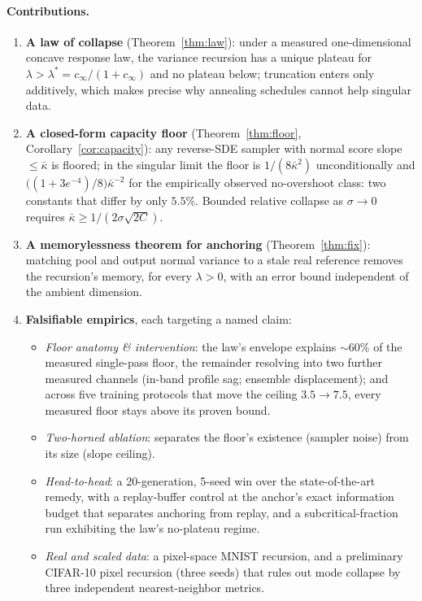 \documentclass[11pt]{article}
\theoremstyle{remark}
\newcommand{\kb}{\bar\kappa}
\begin{document}
\paragraph{Contributions.}
\begin{enumerate}\itemsep2pt
\item \textbf{A law of collapse} (Theorem~\ref{thm:law}): under a measured
  one-dimensional concave response law, the variance recursion has a unique plateau for
  $\lambda>\lambda^*=c_\infty/(1+c_\infty)$ and no plateau below; truncation enters only
  additively, which makes precise why annealing schedules cannot help singular data.
\item \textbf{A closed-form capacity floor} (Theorem~\ref{thm:floor},
  Corollary~\ref{cor:capacity}): any reverse-SDE sampler with normal score slope
  $\le\kb$ is floored; in the singular limit the floor is $1/(8\kb^2)$ unconditionally
  and $\big((1+3e^{-4})/8\big)\kb^{-2}$ for the empirically observed no-overshoot class:
  two constants that differ by only $5.5\%$. Bounded relative collapse as $\sigma\to0$
  requires $\kb\ge 1/(2\sigma\sqrt{2C})$.
\item \textbf{A memorylessness theorem for anchoring} (Theorem~\ref{thm:fix}): matching
  pool and output normal variance to a stale real reference removes the recursion's
  memory, for every $\lambda>0$, with an error bound independent of the ambient dimension.
\item \textbf{Falsifiable empirics}, each targeting a named claim:
  \begin{itemize}\itemsep1pt
  \item \emph{Floor anatomy \& intervention}: the law's envelope explains ${\sim}60\%$ of
    the measured single-pass floor, the remainder resolving into two further measured
    channels (in-band profile sag; ensemble displacement); and across five training
    protocols that move the ceiling $3.5\to7.5$, every measured floor stays above its
    proven bound.
  \item \emph{Two-horned ablation}: separates the floor's existence (sampler noise) from
    its size (slope ceiling).
  \item \emph{Head-to-head}: a 20-generation, 5-seed win over the state-of-the-art remedy,
    with a replay-buffer control at the anchor's exact information budget that separates
    anchoring from replay, and a subcritical-fraction run exhibiting the law's no-plateau
    regime.
  \item \emph{Real and scaled data}: a pixel-space MNIST recursion, and a preliminary
    CIFAR-10 pixel recursion (three seeds) that rules out mode collapse by three
    independent nearest-neighbor metrics.
  \end{itemize}
\end{enumerate}
\end{document}
